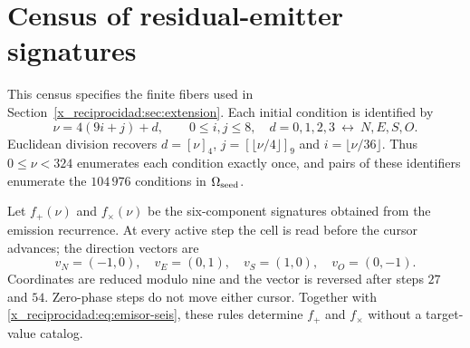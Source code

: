 \chapter{Census of residual-emitter signatures}
\label{x_reciprocidad:app:firmas-emision}

This census specifies the finite fibers used in Section~\ref{x_reciprocidad:sec:extension}.
Each initial condition is identified by
\[
 \nu=4(9i+j)+d,\qquad 0\leq i,j\leq8,\quad
 d=0,1,2,3\ \longleftrightarrow\ N,E,S,O.
\]
Euclidean division recovers \(d=[\nu]_4\), \(j=[\lfloor\nu/4\rfloor]_9\)
and \(i=\lfloor\nu/36\rfloor\). Thus \(0\leq\nu<324\) enumerates
each condition exactly once, and pairs of these identifiers enumerate
the \(104\,976\) conditions in \(\Omega_{\rm seed}\).

Let \(f_+(\nu)\) and \(f_\times(\nu)\) be the six-component signatures
obtained from the emission recurrence. At every active step the cell is read
before the cursor advances; the direction vectors are
\[
 v_N=(-1,0),\quad v_E=(0,1),\quad v_S=(1,0),\quad v_O=(0,-1).
\]
Coordinates are reduced modulo nine and the vector is reversed after
steps \(27\) and \(54\). Zero-phase steps do not move either cursor.
Together with \eqref{x_reciprocidad:eq:emisor-seis}, these rules determine
\(f_+\) and \(f_\times\) without a target-value catalog.

